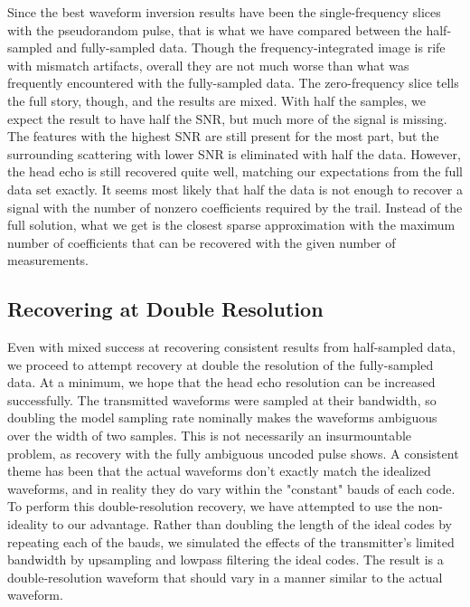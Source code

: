 Since the best waveform inversion results have been the single-frequency slices with the pseudorandom pulse, that is what we have compared between the half-sampled and fully-sampled data. Though the frequency-integrated image is rife with mismatch artifacts, overall they are not much worse than what was frequently encountered with the fully-sampled data. The zero-frequency slice tells the full story, though, and the results are mixed. With half the samples, we expect the result to have half the SNR, but much more of the signal is missing. The features with the highest SNR are still present for the most part, but the surrounding scattering with lower SNR is eliminated with half the data. However, the head echo is still recovered quite well, matching our expectations from the full data set exactly. It seems most likely that half the data is not enough to recover a signal with the number of nonzero coefficients required by the trail. Instead of the full solution, what we get is the closest sparse approximation with the maximum number of coefficients that can be recovered with the given number of measurements.

\subsection{Recovering at Double Resolution}
Even with mixed success at recovering consistent results from half-sampled data, we proceed to attempt recovery at double the resolution of the fully-sampled data. At a minimum, we hope that the head echo resolution can be increased successfully. The transmitted waveforms were sampled at their bandwidth, so doubling the model sampling rate nominally makes the waveforms ambiguous over the width of two samples. This is not necessarily an insurmountable problem, as recovery with the fully ambiguous uncoded pulse shows. A consistent theme has been that the actual waveforms don't exactly match the idealized waveforms, and in reality they do vary within the "constant" bauds of each code. To perform this double-resolution recovery, we have attempted to use the non-ideality to our advantage. Rather than doubling the length of the ideal codes by repeating each of the bauds, we simulated the effects of the transmitter's limited bandwidth by upsampling and lowpass filtering the ideal codes. The result is a double-resolution waveform that should vary in a manner similar to the actual waveform.

